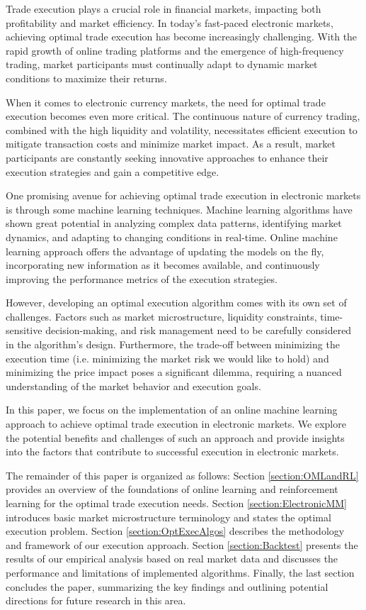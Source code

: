 \introduction %
    Trade execution plays a crucial role in financial markets, impacting both profitability and market efficiency. In 
    today's fast-paced electronic markets, achieving optimal trade execution has become increasingly challenging. With 
    the rapid growth of online trading platforms and the emergence of high-frequency trading, market participants must 
    continually adapt to dynamic market conditions to maximize their returns.

    When it comes to electronic currency markets, the need for optimal trade execution becomes even more critical. The 
    continuous nature of currency trading, combined with the high liquidity and volatility, necessitates efficient 
    execution to mitigate transaction costs and minimize market impact. As a result, market participants are constantly 
    seeking innovative approaches to enhance their execution strategies and gain a competitive edge.

    One promising avenue for achieving optimal trade execution in electronic markets is through some machine learning 
    techniques. Machine learning algorithms have shown great potential in analyzing complex data patterns, identifying 
    market dynamics, and adapting to changing conditions in real-time. Online machine learning approach offers the 
    advantage of updating the models on the fly, incorporating new information as it becomes available, and continuously 
    improving the performance metrics of the execution strategies.

    However, developing an optimal execution algorithm comes with its own set of challenges. Factors such as market 
    microstructure, liquidity constraints, time-sensitive decision-making, and risk management need to be carefully 
    considered in the algorithm's design. Furthermore, the trade-off between minimizing the execution time (i.e. minimizing the market risk we would like to hold)
    and minimizing the price impact poses a significant dilemma, requiring a nuanced understanding of the market behavior and execution goals.

    In this paper, we focus on the implementation of an online machine learning approach to achieve optimal trade execution 
    in electronic markets. We explore the potential benefits and challenges of such an approach and provide insights into the 
    factors that contribute to successful execution in electronic markets.

    The remainder of this paper is organized as follows: 
    Section \ref{section:OMLandRL} provides an overview of the foundations of online learning and reinforcement learning for the optimal trade execution needs. 
    Section \ref{section:ElectronicMM} introduces basic market microstructure terminology and states the optimal execution problem.
    Section \ref{section:OptExecAlgos} describes the methodology and framework of our execution approach. 
    Section \ref{section:Backtest} presents the results of our empirical analysis based on real market data and discusses the performance and limitations of implemented algorithms. 
    Finally, the last section concludes the paper, summarizing the key findings and outlining potential directions for future research in this area.